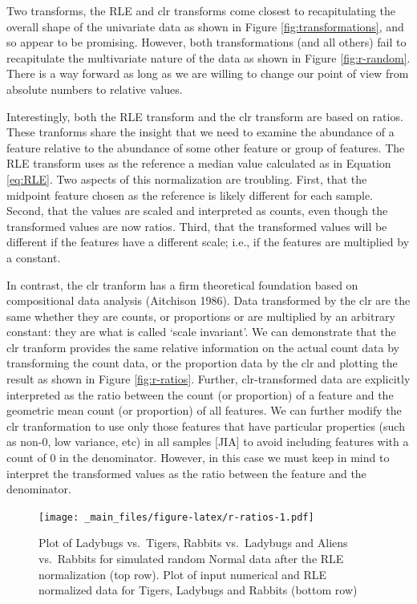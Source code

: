 \documentclass[onecolumn]{article}
\begin{document}
Two transforms, the RLE and clr transforms come closest to recapitulating the overall shape of the univariate data as shown in Figure \ref{fig:transformations}, and so appear to be promising. However, both transformations (and all others) fail to recapitulate the multivariate nature of the data as shown in Figure \ref{fig:r-random}. There is a way forward as long as we are willing to change our point of view from absolute numbers to relative values.

Interestingly, both the RLE transform and the clr transform are based on ratios. These tranforms share the insight that we need to examine the abundance of a feature relative to the abundance of some other feature or group of features. The RLE transform uses as the reference a median value calculated as in Equation \ref{eq:RLE}. Two aspects of this normalization are troubling. First, that the midpoint feature chosen as the reference is likely different for each sample. Second, that the values are scaled and interpreted as counts, even though the transformed values are now ratios. Third, that the transformed values will be different if the features have a different scale; i.e., if the features are multiplied by a constant.

In contrast, the clr tranform has a firm theoretical foundation based on compositional data analysis (Aitchison 1986). Data transformed by the clr are the same whether they are counts, or proportions or are multiplied by an arbitrary constant: they are what is called `scale invariant'. We can demonstrate that the clr tranform provides the same relative information on the actual count data by transforming the count data, or the proportion data by the clr and plotting the result as shown in Figure \ref{fig:r-ratios}. Further, clr-transformed data are explicitly interpreted as the ratio between the count (or proportion) of a feature and the geometric mean count (or proportion) of all features. We can further modify the clr tranformation to use only those features that have particular properties (such as non-0, low variance, etc) in all samples {[}JIA{]} to avoid including features with a count of 0 in the denominator. However, in this case we must keep in mind to interpret the transformed values as the ratio between the feature and the denominator.

\begin{figure}
\centering
\texttt{[image: \_main\_files/figure-latex/r-ratios-1.pdf]}
\caption{\label{fig:r-ratios}\label{R_random} Plot of Ladybugs vs.~Tigers, Rabbits vs.~Ladybugs and Aliens vs.~Rabbits for simulated random Normal data after the RLE normalization (top row). Plot of input numerical and RLE normalized data for Tigers, Ladybugs and Rabbits (bottom row)}
\end{figure}
\end{document}
